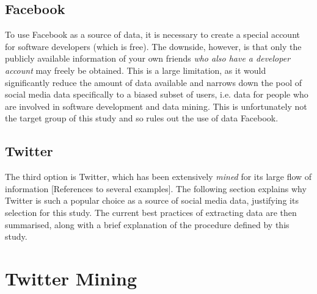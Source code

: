 \documentclass{article}
\begin{document}
\subsection{Facebook}
\label{sec-1-2}
To use Facebook as a source of data, it is necessary to create a special account for software developers (which is free). The downside, however, is that only the publicly available information of your own friends \emph{who also have a developer account} may freely be obtained. This is a large limitation, as it would significantly reduce the amount of data available and narrows down the pool of social media data specifically to a biased subset of users, i.e. data for people who are involved in software development and data mining. This is unfortunately not the target group of this study and so rules out the use of data Facebook.


\subsection{Twitter}
\label{sec-1-3}
The third option is Twitter, which has been extensively \emph{mined} for its large flow of information [References to several examples]. The following section explains why Twitter is such a popular choice as a source of social media data, justifying its selection for this study. The current best practices of extracting data are then summarised, along with a brief explanation of the procedure defined by this study.


\section{Twitter Mining}
\label{sec-2}
\end{document}
